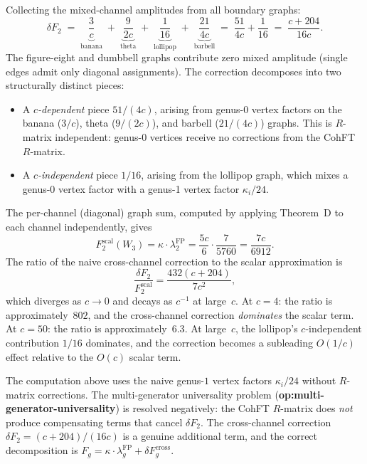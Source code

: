Collecting the mixed-channel amplitudes from all boundary graphs:
\begin{equation}\label{eq:cross-channel-total}
\delta F_2
\;=\;
\underbrace{\frac{3}{c}}_{\text{banana}}
\;+\;
\underbrace{\frac{9}{2c}}_{\text{theta}}
\;+\;
\underbrace{\frac{1}{16}}_{\text{lollipop}}
\;+\;
\underbrace{\frac{21}{4c}}_{\text{barbell}}
\;=\;
\frac{51}{4c} + \frac{1}{16}
\;=\;
\frac{c + 204}{16c}.
\end{equation}
The figure-eight and dumbbell graphs contribute zero mixed amplitude
(single edges admit only diagonal assignments). The correction
decomposes into two structurally distinct pieces:
\begin{itemize}
\item A \emph{$c$-dependent} piece $51/(4c)$, arising from
 genus-0 vertex factors on the banana ($3/c$), theta ($9/(2c)$),
 and barbell ($21/(4c)$) graphs. This is
 $R$-matrix independent: genus-0 vertices receive no corrections
 from the CohFT $R$-matrix.
\item A \emph{$c$-independent} piece $1/16$, arising from the
 lollipop graph, which mixes a genus-0 vertex factor with a
 genus-1 vertex factor $\kappa_i/24$.
\end{itemize}

\begin{remark}
\label{rem:scalar-comparison}
The per-channel (diagonal) graph sum, computed by applying Theorem~D
to each channel independently, gives
\begin{equation}\label{eq:F2-scalar}
F_2^{\mathrm{scal}}(W_3) = \kappa \cdot \lambda_2^{\mathrm{FP}}
= \frac{5c}{6} \cdot \frac{7}{5760} = \frac{7c}{6912}.
\end{equation}
The ratio of the naive cross-channel correction to the scalar
approximation is
\begin{equation}\label{eq:cross-channel-ratio}
\frac{\delta F_2}{F_2^{\mathrm{scal}}}
= \frac{432(c+204)}{7c^2},
\end{equation}
which diverges as $c \to 0$ and decays as $c^{-1}$ at large~$c$.
At $c = 4$: the ratio is approximately~$802$, and the cross-channel
correction \emph{dominates} the scalar term. At $c = 50$: the
ratio is approximately~$6.3$.
At large~$c$, the lollipop's $c$-independent contribution $1/16$
dominates, and the correction becomes a subleading $O(1/c)$ effect
relative to the $O(c)$ scalar term.
\end{remark}

\begin{remark}
\label{rem:cross-channel-status}
The computation above uses the naive genus-$1$ vertex factors
$\kappa_i/24$ without $R$-matrix corrections. The
multi-generator universality problem
(\textbf{op:multi-generator-universality}) is resolved negatively:
the CohFT $R$-matrix does \emph{not} produce compensating terms
that cancel $\delta F_2$. The cross-channel correction
$\delta F_2 = (c{+}204)/(16c)$ is a genuine additional term,
and the correct decomposition is
$F_g = \kappa \cdot \lambda_g^{\mathrm{FP}} +
\delta F_g^{\mathrm{cross}}$.
\end{remark}


